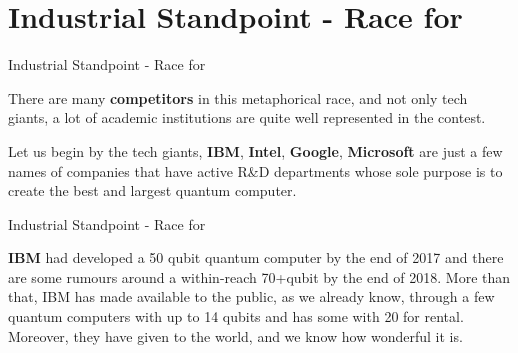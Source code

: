 \documentclass[aspectratio=43]{beamer}
\begin{document}
\section{Industrial Standpoint - Race for \q}
\begin{frame}{Industrial Standpoint - Race for \q}
    \begin{card}
        There are many \textbf{competitors} in this metaphorical race, and not only tech giants, a lot of academic institutions are quite well represented in the contest.
    \end{card}
    \begin{card}
        Let us begin by the tech giants, \textbf{IBM}, \textbf{Intel}, \textbf{Google}, \textbf{Microsoft} are just a few names of companies that have active R\&D departments whose sole purpose is to create the best and largest quantum computer. 
    \end{card}
\pagenumber
\end{frame}

\begin{frame}{Industrial Standpoint - Race for \q}
    \begin{card}
        \textbf{IBM} had developed a 50 qubit quantum computer by the end of 2017 and there are some rumours around a within-reach 70+qubit by the end of 2018. More than that, IBM has made available to the public, as we already know, through \href{https://quantumexperience.ng.bluemix.net/qx}{\imqe} a few quantum computers with up to 14 qubits and has some with 20 for rental.\\
        Moreover, they have given \href{https://qiskit.org/}{\qk} to the world, and we know how wonderful it is.
    \end{card}
\pagenumber
\end{frame}
\end{document}
